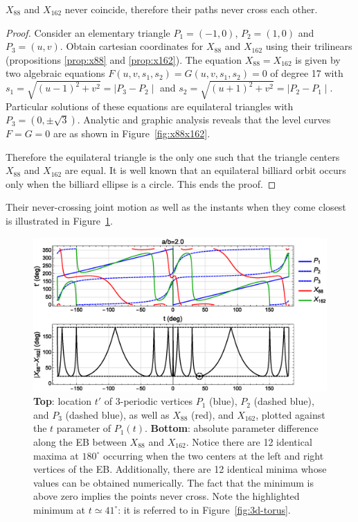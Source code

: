 \begin{proposition}
$X_{88}$ and $X_{162}$ never coincide, therefore their paths never cross each other.
\end{proposition}

\begin{proof}
Consider an elementary triangle $P_1=(-1,0)$, $P_2=(1,0)$ and $P_3=(u,v).$
Obtain cartesian coordinates for $X_{88}$ and $X_{162}$ using their trilinears (propositions \ref{prop:x88} and \ref{prop:x162}). The equation $X_{88}=X_{162}$ is given by two algebraic equations $F(u,v,s_1,s_2)=G(u,v,s_1,s_2)=0$ of degree 17 with   $s_1=\sqrt{(u-1)^2+v^2}=\mid P_3-P_2\mid$ and $s_2=\sqrt{(u+1)^2+v^2}=\mid P_2-P_1\mid$.
Particular solutions of these equations are    equilateral triangles with $P_3=(0,\pm \sqrt{3}).$ 
Analytic and  graphic analysis reveals that the level curves $F=G=0$ are as shown in Figure~\ref{fig:x88x162}.

Therefore the equilateral triangle is the only one such that    the triangle centers $X_{88}$ and $X_{162}$ are equal.  It is well known that an equilateral billiard orbit occurs only  when the billiard ellipse is a circle. This ends the proof.
\end{proof}

Their never-crossing joint motion as well as the instants when they come closest is illustrated in Figure~\ref{fig:flat-torus}.

\begin{figure}[H]
    \centering
    \includegraphics[width=\textwidth]{pics/1150_flat_torus_x88_x126.eps}
    \caption{\textbf{Top}: location $t'$ of 3-periodic vertices $P_1$ (blue), $P_2$ (dashed blue), and $P_3$ (dashed blue), as well as $X_{88}$ (red), and $X_{162}$, plotted against the $t$ parameter of $P_1(t)$. \textbf{Bottom}: absolute parameter difference along the EB between $X_{88}$ and $X_{162}$. Notice there are 12 identical maxima at $180^\circ$ occurring when the two centers at the left and right vertices of the EB. Additionally, there are 12 identical minima whose values can be obtained numerically. The fact that the minimum is above zero implies the points never cross. Note the highlighted minimum at $t{\simeq}41^\circ$: it is referred to in Figure~\ref{fig:3d-torus}.}
    \label{fig:flat-torus}
\end{figure}

